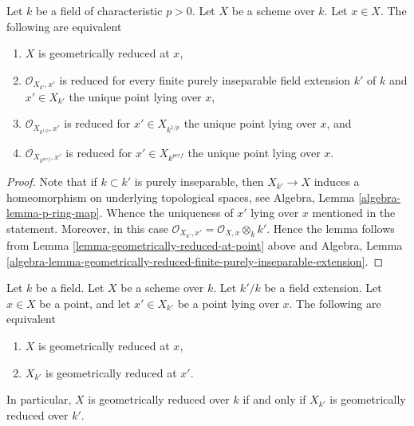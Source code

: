\begin{lemma}
\label{lemma-check-only-finite-inseparable-extensions}
Let $k$ be a field of characteristic $p > 0$. Let $X$ be a scheme over $k$.
Let $x \in X$. The following are equivalent
\begin{enumerate}
\item $X$ is geometrically reduced at $x$,
\item $\mathcal{O}_{X_{k'}, x'}$ is reduced for every
finite purely inseparable field extension $k'$ of $k$ and
$x' \in X_{k'}$ the unique point lying over $x$,
\item $\mathcal{O}_{X_{k^{1/p}}, x'}$ is reduced for
$x' \in X_{k^{1/p}}$ the unique point lying over $x$, and
\item $\mathcal{O}_{X_{k^{perf}}, x'}$ is reduced for
$x' \in X_{k^{perf}}$ the unique point lying over $x$.
\end{enumerate}
\end{lemma}

\begin{proof}
Note that if $k \subset k'$ is purely inseparable, then
$X_{k'} \to X$ induces a homeomorphism on underlying topological
spaces, see Algebra, Lemma \ref{algebra-lemma-p-ring-map}.
Whence the uniqueness of $x'$ lying over $x$ mentioned in the
statement. Moreover, in this case
$\mathcal{O}_{X_{k'}, x'} = \mathcal{O}_{X, x} \otimes_k k'$.
Hence the lemma follows from Lemma \ref{lemma-geometrically-reduced-at-point}
above and Algebra, Lemma
\ref{algebra-lemma-geometrically-reduced-finite-purely-inseparable-extension}.
\end{proof}

\begin{lemma}
\label{lemma-geometrically-reduced-upstairs}
Let $k$ be a field.
Let $X$ be a scheme over $k$.
Let $k'/k$ be a field extension.
Let $x \in X$ be a point, and let $x' \in X_{k'}$ be a point lying over $x$.
The following are equivalent
\begin{enumerate}
\item $X$ is geometrically reduced at $x$,
\item $X_{k'}$ is geometrically reduced at $x'$.
\end{enumerate}
In particular, $X$ is geometrically reduced over $k$ if and only if
$X_{k'}$ is geometrically reduced over $k'$.
\end{lemma}

